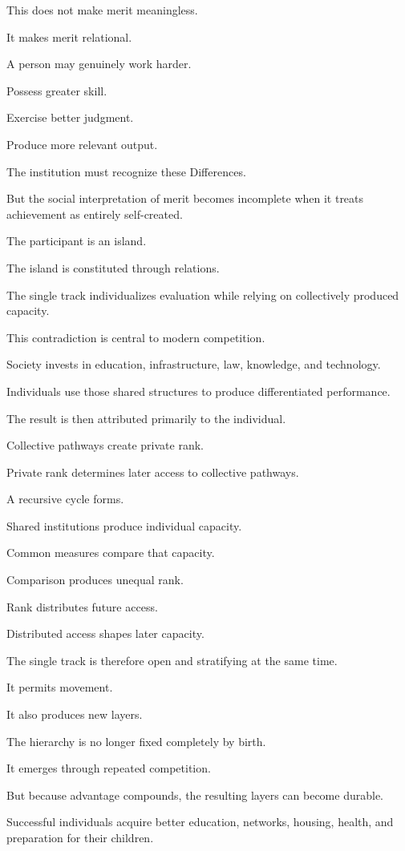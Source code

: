 This does not make merit meaningless.

It makes merit relational.

A person may genuinely work harder.

Possess greater skill.

Exercise better judgment.

Produce more relevant output.

The institution must recognize these Differences.

But the social interpretation of merit becomes incomplete when it treats achievement as entirely self-created.

The participant is an island.

The island is constituted through relations.

The single track individualizes evaluation while relying on collectively produced capacity.

This contradiction is central to modern competition.

Society invests in education, infrastructure, law, knowledge, and technology.

Individuals use those shared structures to produce differentiated performance.

The result is then attributed primarily to the individual.

Collective pathways create private rank.

Private rank determines later access to collective pathways.

A recursive cycle forms.

Shared institutions produce individual capacity.

Common measures compare that capacity.

Comparison produces unequal rank.

Rank distributes future access.

Distributed access shapes later capacity.

The single track is therefore open and stratifying at the same time.

It permits movement.

It also produces new layers.

The hierarchy is no longer fixed completely by birth.

It emerges through repeated competition.

But because advantage compounds, the resulting layers can become durable.

Successful individuals acquire better education, networks, housing, health, and preparation for their children.

